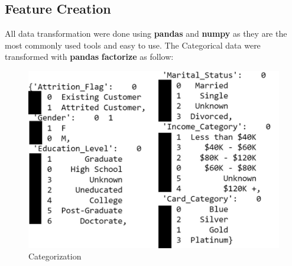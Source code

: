 \documentclass{homeworg}
\begin{document}
\subsection{Feature Creation}
All data transformation were done using \textbf{pandas} and \textbf{numpy} as they are the most commonly used tools and easy to use. 
The Categorical data were transformed with \textbf{pandas} \textbf{factorize} as follow:
\begin{figure}[H]
    \centering
    \includegraphics[scale=0.7]{figure/Categorization.jpg}
    \caption{Categorization}
    \label{fig:category}
\end{figure}
\par
\end{document}

